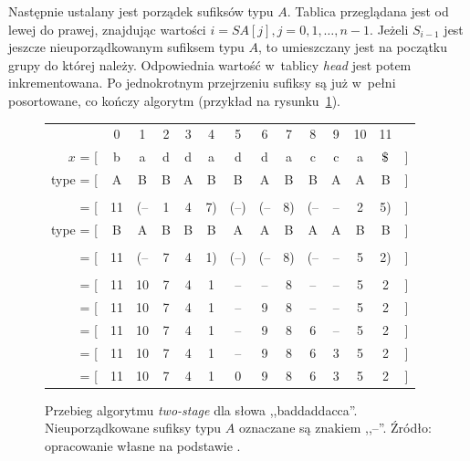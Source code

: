 Następnie ustalany jest porządek sufiksów typu $A$. Tablica \SA{} przeglądana
jest od lewej do prawej, znajdując wartości $i=\mathit{SA}[j], j=0,1,\ldots,n-1$. Jeżeli
$S_{i-1}$ jest jeszcze nieuporządkowanym sufiksem typu $A$, to umieszczany jest
na początku grupy do której należy. Odpowiednia wartość w~tablicy \emph{head} jest potem
inkrementowana. Po jednokrotnym przejrzeniu \SA{} sufiksy są już w~pełni
posortowane, co kończy algorytm (przykład na rysunku~\ref{rys:it}).

\begin{figure}[ht]
        \begin{center} \small
            \begin{tabular}{r c c c c c c c c c c c c l}                           
                 & 0  & 1  & 2  & 3  & 4  & 5   & 6  & 7  & 8  & 9  & 10 & 11       \\ \cmidrule{2-13} 
         $x$ = [ & b  & a  & d  & d  & a  & d   & d  & a  & c  & c  & a  &
         $\dollar$ & ] \\ type = [ & A  & B  & B  & A  & B  & B   & A  & B  & B  & A  & A  & B    & ] \\ \addlinespace[1em]
	
       \multicolumn{14}{c}{\emph{1-sort}}\\
       \SA{} = [ & 11 & (-- & 1  & 4  & 7) & (--) & (-- & 8) & (-- & --  & 2  & 5)   & ] \\
        type = [ & B  & A  & B  & B  & B  & A   & A  & B  & A  & A  & B  & B    & ] \\ \addlinespace[1em]
	
       \multicolumn{14}{c}{sortowanie sufiksów typu $B$} \\
       \SA{} = [ & 11 & (-- & 7  & 4  & 1) & (--) & (-- & 8) & (-- & --  & 5  & 2)   & ] \\ \addlinespace[1em]
	
       \multicolumn{14}{c}{wstawianie sufiksów typu $A$}\\
       \SA{} = [ & 11 & 10 & 7  & 4  & 1  & --   & --  & 8  & --  & --  & 5  & 2   & ] \\
       \SA{} = [ & 11 & 10 & 7  & 4  & 1  & --   & 9  & 8  & --  & --  & 5  & 2   & ] \\
       \SA{} = [ & 11 & 10 & 7  & 4  & 1  & --   & 9  & 8  & 6  & --  & 5  & 2   & ] \\
       \SA{} = [ & 11 & 10 & 7  & 4  & 1  & --   & 9  & 8  & 6  & 3  & 5  & 2   & ] \\
       \SA{} = [ & 11 & 10 & 7  & 4  & 1  & 0   & 9  & 8  & 6  & 3  & 5  & 2   & ] \\
            \end{tabular}            
        \end{center}                         
    \caption{Przebieg algorytmu \emph{two-stage} dla słowa ,,baddaddacca''.
    Nieuporządkowane sufiksy typu $A$ oznaczane są znakiem ,,--''. Źródło:
    opracowanie własne na podstawie \cite{taxonomy}.}%
    \label{rys:it}
\end{figure}


